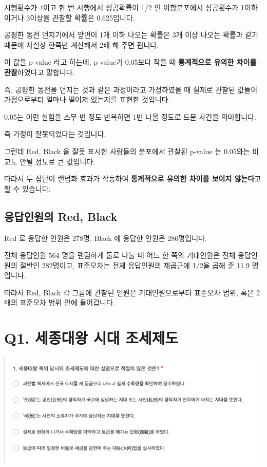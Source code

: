 \documentclass[
]{book}
\begin{document}
시행횟수가 4이고 한 번 시행에서 성공확률이 1/2 인 이항분포에서 성공횟수가 1이하이거나 3이상을 관찰할 확률은 0.625입니다.

공평한 동전 던지기에서 앞면이 1개 이하 나오는 확률은 3개 이상 나오는 확률과 같기 때문에 사실상 한쪽만 계산해서 2배 해 주면 됩니다.

이 값을 p-value 라고 하는데, p-value가 0.05보다 작을 때 \textbf{통계적으로 유의한 차이를 관찰}하였다고 말합니다.

즉, 공평한 동전을 던지는 것과 같은 과정이라고 가정하였을 때 실제로 관찰된 값들이 가정으로부터 얼마나 떨어져 있는지를 표현한 것입니다.

0.05는 이런 실험을 스무 번 정도 반복하면 1번 나올 정도로 드문 사건을 의미합니다.

즉 가정이 잘못되었다는 것입니다.

그런데 Red, Black 을 잘못 표시한 사람들의 분포에서 관찰된 p-value 는 0.05와는 비교도 안될 정도로 큰 값입니다.

따라서 두 집단이 랜덤화 효과가 작동하여 \textbf{통계적으로 유의한 차이를 보이지 않는다}고 할 수 있습니다.

\subsection{응답인원의 Red, Black}\label{uxc751uxb2f5uxc778uxc6d0uxc758-red-black-3}

Red 로 응답한 인원은 278명, Black 에 응답한 인원은 286명입니다.

전체 응답인원 564 명을 랜덤하게 둘로 나눌 때 어느 한 쪽의 기대인원은 전체 응답인원의 절반인 282명이고, 표준오차는 전체 응답인원의 제곱근에 1/2을 곱해 준 11.9 명입니다.

따라서 Red, Black 각 그룹에 관찰된 인원은 기대인원으로부터 표준오차 범위, 혹은 2배의 표준오차 범위 안에 들어갑니다.

\section{Q1. 세종대왕 시대 조세제도}\label{q1.-uxc138uxc885uxb300uxc655-uxc2dcuxb300-uxc870uxc138uxc81cuxb3c4}

\includegraphics[width=0.75\linewidth]{./pics/Quiz230322_Q1}
\end{document}
